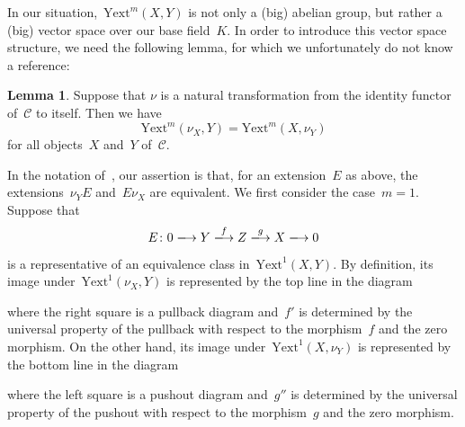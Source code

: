 \documentclass[12pt]{article}
\makeatletter
\theoremstyle{definition}
\newtheorem{Lemma}[Satz]{Lemma}
\theoremstyle{break}
\renewenvironment{proof}[1][\proofname]{\par
\vspace{-5pt}%
\pushQED{\qed}%
\normalfont
\topsep0pt \partopsep0pt %
\trivlist
\item[\hskip\labelsep
\bfseries
#1\@addpunct{.}]\ignorespaces
}{%
\popQED\endtrivlist\@endpefalse
\addvspace{6pt plus 6pt} %
}
\newcommand{\CC}{\mathcal{C}}
\DeclareMathOperator\id{id}
\newcommand{\Yext}{\mathrm{Yext}}
\renewcommand{\1}{\mathbbm{1}}
\makeatother
\begin{document}
In our situation,~$\Yext^m(X,Y)$ is not only a (big) abelian group, but rather a (big) vector space over our base field~$K$. In order to introduce this vector space structure, we need the following lemma, for which we unfortunately do not know a reference:
\begin{Lemma} \label{YonedaNat}
Suppose that $\nu$ is a natural transformation from the
identity functor of~$\CC$ to itself. Then we have
\[\Yext^m(\nu_X,Y) = \Yext^m(X,\nu_Y)\]
for all objects~$X$ and~$Y$ of~$\CC$.
\end{Lemma}
\begin{proof}
In the notation of~\cite[Chap.~VII, \S~1, p.~162f]{Mi}, our assertion is that, for an extension~$E$ as above, the extensions~$\nu_Y E$ and~$ E \nu_X$ are equivalent. We first consider the case~$m=1$. Suppose that
\[E \colon 0 \xlongrightarrow{} Y \xlongrightarrow{f} Z \xlongrightarrow{g} X
\xlongrightarrow{} 0\]
is a representative of an equivalence class in~$\Yext^1(X,Y)$. By definition, its image under~$\Yext^1(\nu_X,Y)$ is represented by the top line in the diagram
\begin{center}
\end{center}
where the right square is a pullback diagram and~$f'$ is determined by the universal property of the pullback with respect to the morphism~$f$ and the zero morphism. On the other hand, its image under~$\Yext^1(X,\nu_Y)$ is represented by the bottom line in the diagram
\begin{center}
\end{center}
where the left square is a pushout diagram and~$g''$ is determined by the universal property of the pushout with respect to the morphism~$g$ and the zero morphism.


\end{proof}
\end{document}

